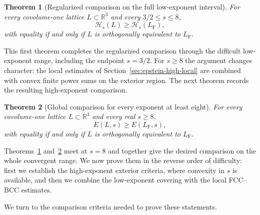 \documentclass[reqno,english]{amsart}
\newtheorem{theorem}{Theorem}[section]
\theoremstyle{definition}
\newtheorem{open problem}[theorem]{Open Problem}
\theoremstyle{remark}
\theoremstyle{plain}
\newcommand{\R}{{\mathbb R}}
\numberwithin{equation}{section}
\newcommand{\FCC}{L_{\mathrm F}}
\newcommand{\HH}{\mathcal H}
\begin{document}
\begin{theorem}[Regularized comparison on the full low-exponent interval]\label{E:thm:global-low}
For every covolume-one lattice $L\subset\R^3$ and every
$3/2\le s\le8$,
\[
 \HH_s(L)\ge\HH_s(\FCC),
\]
with equality if and only if $L$ is orthogonally equivalent to $\FCC$.
\end{theorem}

This first theorem completes the regularized comparison through the difficult low-exponent range, including the endpoint $s=3/2$. For $s\ge8$ the argument changes character: the local estimates of Section~\ref{sec:epstein-high-local} are combined with convex finite power sums on the exterior region. The next theorem records the resulting high-exponent comparison.

\begin{theorem}[Global comparison for every exponent at least eight]\label{E:thm:global8}
For every covolume-one lattice $L\subset\R^3$ and every
real $s\ge8$,
\[
 E(L,s)\ge E(\FCC,s),
\]
with equality if and only if $L$ is orthogonally equivalent to $\FCC$.
\end{theorem}

Theorems~\ref{E:thm:global-low} and~\ref{E:thm:global8} meet at $s=8$ and together give the desired comparison on the whole convergent range. We now prove them in the reverse order of difficulty: first we establish the high-exponent exterior criteria, where convexity in $s$ is available, and then we combine the low-exponent covering with the local FCC--BCC estimates.

We turn to the comparison criteria needed to prove these statements.
\end{document}
